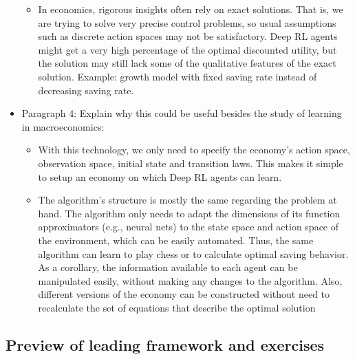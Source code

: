 \documentclass[11pt,english]{article}
\begin{document}
\begin{itemize}
\begin{itemize}
		\item In economics, rigorous insights often rely on exact solutions. That is, we are trying to solve very precise control problems, so usual assumptions such as discrete action spaces may not be satisfactory. Deep RL agents might get a very high percentage of the optimal discounted utility, but the solution may still lack some of the qualitative features of the exact solution. Example: growth model with fixed saving rate instead of decreasing saving rate. \medskip
	\end{itemize}

		\item Paragraph 4: Explain why this could be useful besides the study of learning in macroeconomics: \medskip 
	
	\begin{itemize}
		\item With this technology, we only need to specify the economy's action space, observation space, initial state and transition laws. This makes it simple to setup an economy on which Deep RL agents can learn. \medskip
		
		\item The algorithm's structure is mostly the same regarding the problem at hand. The algorithm only needs to adapt the dimensions of its function approximators (e.g., neural nets) to the state space and action space of the environment, which can be easily automated. Thus, the same algorithm can learn to play chess or to calculate optimal saving behavior. As a corollary, the information available to each agent can be manipulated easily, without making any changes to the algorithm. Also, different versions of the economy can be constructed without need to recalculate the set of equations that describe the optimal solution  \medskip
	\end{itemize}

	\end{itemize}

	\subsection{Preview of leading framework and exercises} 
	
\end{document}
